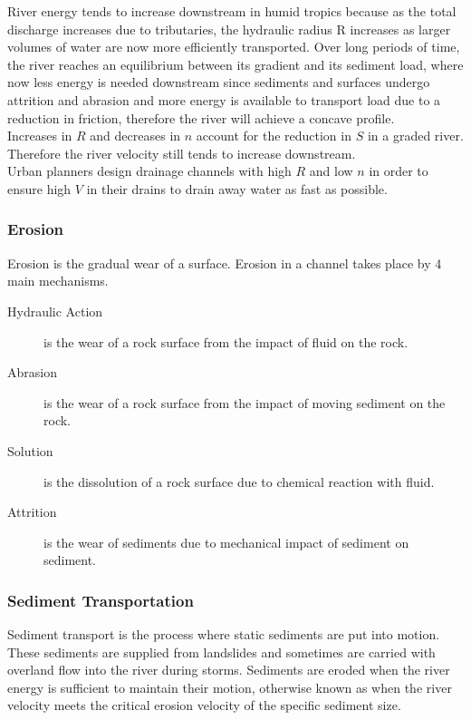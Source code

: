 \documentclass[../../main]{subfiles}
\begin{document}
	River energy tends to increase downstream in humid tropics because as the total discharge increases due to tributaries, the hydraulic radius R increases as larger volumes of water are now more efficiently transported. Over long periods of time, the river reaches an equilibrium between its gradient and its sediment load, where now less energy is needed downstream since sediments and surfaces undergo attrition and abrasion and more energy is available to transport load due to a reduction in friction, therefore the river will achieve a concave profile. \\

	Increases in \(R\) and decreases in \(n\) account for the reduction in \(S\) in a graded river. Therefore the river velocity still tends to increase downstream. \\

	Urban planners design drainage channels with high \(R\) and low \(n\) in order to ensure high \(V\) in their drains to drain away water as fast as possible.

\subsubsection{Erosion}

	Erosion is the gradual wear of a surface. Erosion in a channel takes place by 4 main mechanisms.

	\begin{description}
		\item[Hydraulic Action] is the wear of a rock surface from the impact of fluid on the rock.
		\item[Abrasion] is the wear of a rock surface from the impact of moving sediment on the rock.
		\item[Solution] is the dissolution of a rock surface due to chemical reaction with fluid.
		\item[Attrition] is the wear of sediments due to mechanical impact of sediment on sediment.
	\end{description}

\subsubsection{Sediment Transportation}

	Sediment transport is the process where static sediments are put into motion. These sediments are supplied from landslides and sometimes are carried with overland flow into the river during storms. Sediments are eroded when the river energy is sufficient to maintain their motion, otherwise known as when the river velocity meets the critical erosion velocity of the specific sediment size. \\
\end{document}
